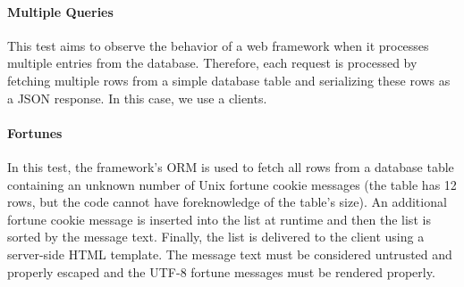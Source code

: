 \paragraph{Multiple Queries}
This test aims to observe the behavior of a web framework when it processes multiple entries from the database.
Therefore, each request is processed by fetching multiple rows from a simple database table and serializing these rows as a JSON response.
In this case, we use a   clients.

\paragraph{Fortunes}
In this test, the framework's ORM is used to fetch all rows from a database table containing an unknown number of Unix fortune cookie messages (the table has 12 rows, but the code cannot have foreknowledge of the table's size).
An additional fortune cookie message is inserted into the list at runtime and then the list is sorted by the message text.
Finally, the list is delivered to the client using a server-side HTML template. 
The message text must be considered untrusted and properly escaped and the UTF-8 fortune messages must be rendered properly.


